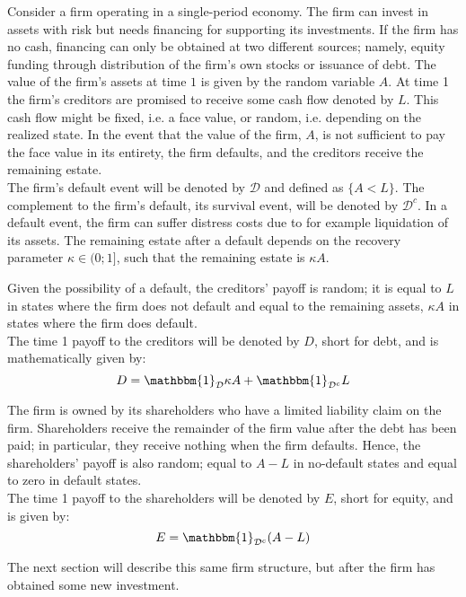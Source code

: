 \documentclass[main.tex]{subfiles}
\begin{document}
        Consider a firm operating in a single-period economy.
        The firm can invest in assets with risk but needs financing for supporting its investments.
        If the firm has no cash, financing can only be obtained at two different sources;
        namely, equity funding through distribution of the firm's own stocks or issuance of debt.
        The value of the firm's assets at time $1$ is given by the random variable $A$.
        At time 1 the firm's creditors are promised to receive some cash flow denoted by $L$.
        This cash flow might be fixed, i.e. a face value, 
        or random, i.e. depending on the realized state.
        In the event that the value of the firm, $A$, is not sufficient to pay the face value in its entirety, 
        the firm defaults, and the creditors receive the remaining estate.
        \\
        The firm's default event will be denoted by $\mathcal{D}$ and defined as $\{A < L\}$.
        The complement to the firm's default, its survival event, 
        will be denoted by $\mathcal{D}^{c}$.
        In a default event, the firm can suffer distress costs due to for example liquidation of its assets.
        The remaining estate after a default depends on the recovery parameter $\kappa \in (0;1]$, 
        such that the remaining estate is $\kappa A$.
        
        Given the possibility of a default, the creditors' payoff is random; 
        it is equal to $L$ in states where the firm does not default
        and equal to the remaining assets, $\kappa A$ in states where the firm does default.
        \\
        The time 1 payoff to the creditors will be denoted by $D$, short for debt,
        and is mathematically given by:
            \begin{equation}
                D
                =
                \mathbbm{1}_{\mathcal{D}} \kappa A
                +
                \mathbbm{1}_{\mathcal{D}^{c}} L
            \end{equation}
        
        The firm is owned by its shareholders who have a limited liability claim on the firm.
        Shareholders receive the remainder of the firm value after the debt has been paid;
        in particular, they receive nothing when the firm defaults.
        Hence, the shareholders' payoff is also random;
        equal to $A - L$ in no-default states and equal to zero in default states.
        \\
        The time 1 payoff to the shareholders will be denoted by $E$, short for equity,
        and is given by:
            \begin{equation}
                E
                =
                \mathbbm{1}_{\mathcal{D}^{c}} 
                (A - L)
            \end{equation}
        
        The next section will describe this same firm structure,
        but after the firm has obtained some new investment. 
\end{document}

